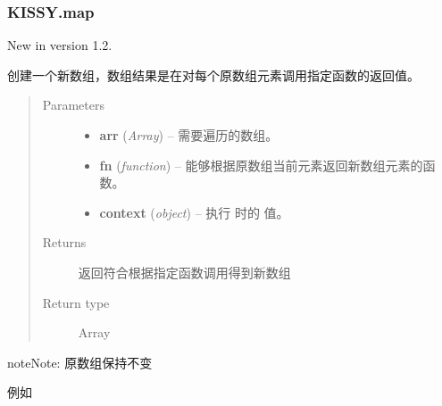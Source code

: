 \documentclass[letterpaper,10pt,english]{sphinxmanual}
\begin{document}
\subsubsection{KISSY.map}
\label{api/seed/lang/map:kissy-map}\label{api/seed/lang/map::doc}New in version 1.2.

\begin{fulllineitems}
\label{api/seed/lang/map:Lang.KISSY.map}
创建一个新数组，数组结果是在对每个原数组元素调用指定函数的返回值。
\begin{quote}\begin{description}
\item[{Parameters}] \leavevmode\begin{itemize}
\item {}
\textbf{arr} (\emph{Array}) -- 需要遍历的数组。

\item {}
\textbf{fn} (\emph{function}) -- 能够根据原数组当前元素返回新数组元素的函数。

\item {}
\textbf{context} (\emph{object}) -- 执行  时的  值。

\end{itemize}

\item[{Returns}] \leavevmode
返回符合根据指定函数调用得到新数组

\item[{Return type}] \leavevmode
Array

\end{description}\end{quote}

\end{fulllineitems}


\begin{notice}{note}{Note:}
原数组保持不变
\end{notice}

例如
\end{document}
